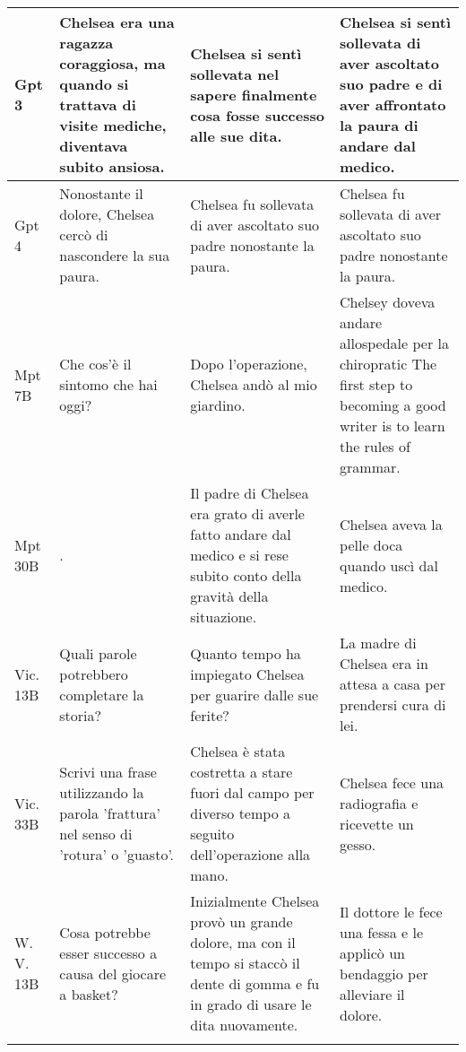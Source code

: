 \begin{center}
\begin{longtable}{l|p{4.5cm}|p{4.5cm}|p{4.5cm}}
Gpt 3 &  Chelsea era una ragazza coraggiosa, ma quando si trattava di visite mediche, diventava subito ansiosa. &  Chelsea si sentì sollevata nel sapere finalmente cosa fosse successo alle sue dita. &  Chelsea si sentì sollevata di aver ascoltato suo padre e di aver affrontato la paura di andare dal medico. \\ \midrule
Gpt 4 &  Nonostante il dolore, Chelsea cercò di nascondere la sua paura. &  Chelsea fu sollevata di aver ascoltato suo padre nonostante la paura. &  Chelsea fu sollevata di aver ascoltato suo padre nonostante la paura. \\ \midrule
Mpt 7B &  Che cos'è il sintomo che hai oggi? &  Dopo l'operazione, Chelsea andò al mio giardino. & Chelsey doveva andare allospedale per la chiropratic The first step to becoming a good writer is to learn the rules of grammar. \\ \midrule
Mpt 30B &  . &  Il padre di Chelsea era grato di averle fatto andare dal medico e si rese subito conto della gravità della situazione. & Chelsea aveva la pelle doca quando uscì dal medico. \\ \midrule
Vic. 13B &  Quali parole potrebbero completare la storia? &  Quanto tempo ha impiegato Chelsea per guarire dalle sue ferite? & La madre di Chelsea era in attesa a casa per prendersi cura di lei. \\ \midrule
Vic. 33B &   Scrivi una frase utilizzando la parola 'frattura' nel senso di 'rotura' o 'guasto'. &  Chelsea è stata costretta a stare fuori dal campo per diverso tempo a seguito dell'operazione alla mano. & Chelsea fece una radiografia e ricevette un gesso. \\ \midrule
W. V. 13B &  Cosa potrebbe esser successo a causa del giocare a basket? &  Inizialmente Chelsea provò un grande dolore, ma con il tempo si staccò il dente di gomma e fu in grado di usare le dita nuovamente. & Il dottore le fece una fessa e le applicò un bendaggio per alleviare il dolore. \\

\arrayrulecolor{black}
\bottomrule
\end{longtable}

\end{center}
